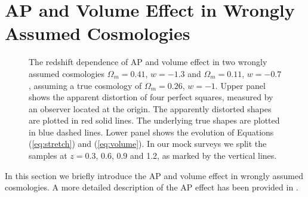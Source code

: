 \documentclass[useAMS,usenatbib]{mn2e}
\begin{document}

\section{AP and Volume Effect in Wrongly Assumed Cosmologies}
\label{sec:APeffect}

\begin{figure*}
   \caption{\label{fig_xy}
   The redshift dependence of AP and volume effect in two wrongly assumed cosmologies $\Omega_m=0.41$, $w=-1.3$ and $\Omega_m=0.11$, $w=-0.7$,
   assuming a true cosmology of $\Omega_m=0.26$, $w=-1$.
   Upper panel shows the apparent distortion of four perfect squares,
   measured by an observer located at the origin.
   The apparently distorted shapes are plotted in red solid lines.
   The underlying true shapes are plotted in blue dashed lines.
   Lower panel shows the evolution of Equations (\ref{eq:stretch}) and (\ref{eq:volume}).
   In our mock surveys we split the samples at $z=0.3$, 0.6, 0.9 and 1.2, as marked by the vertical lines.
   }
\end{figure*}

In this section we briefly introduce the AP and volume effect in wrongly assumed cosmologies.
A more detailed description of the AP effect has been provided in \cite{Li2014}.
\end{document}
